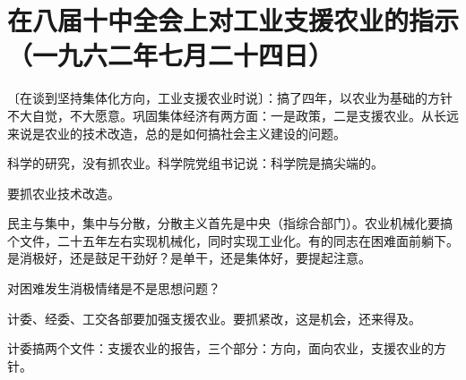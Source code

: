 \section{在八届十中全会上对工业支援农业的指示（一九六二年七月二十四日）}


〔在谈到坚持集体化方向，工业支援农业时说〕：搞了四年，以农业为基础的方针不大自觉，不大愿意。巩固集体经济有两方面：一是政策，二是支援农业。从长远来说是农业的技术改造，总的是如何搞社会主义建设的问题。

科学的研究，没有抓农业。科学院党组书记说：科学院是搞尖端的。

要抓农业技术改造。

民主与集中，集中与分散，分散主义首先是中央（指综合部门）。农业机械化要搞个文件，二十五年左右实现机械化，同时实现工业化。有的同志在困难面前躺下。是消极好，还是鼓足干劲好？是单干，还是集体好，要提起注意。

对困难发生消极情绪是不是思想问题？

计委、经委、工交各部要加强支援农业。要抓紧改，这是机会，还来得及。

计委搞两个文件：支援农业的报告，三个部分：方向，面向农业，支援农业的方针。


